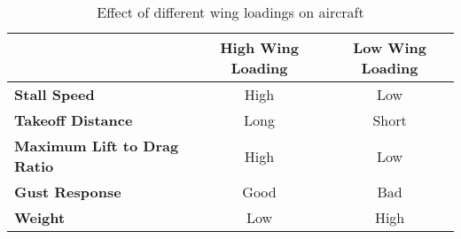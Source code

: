 \begin{table}[H]
\centering
    \begin{tabular}{@{}lcc@{}}
    \toprule
                                        & \textbf{High Wing Loading} & \textbf{Low Wing Loading} \\ \midrule
    \textbf{Stall Speed}                & High                       & Low                       \\
    \textbf{Takeoff Distance}           & Long                       & Short                     \\
    \textbf{Maximum Lift to Drag Ratio} & High                       & Low                       \\
    \textbf{Gust Response}              & Good                       & Bad                       \\
    \textbf{Weight}                     & Low                        & High                      \\ \bottomrule
    \end{tabular}
\caption{Effect of different wing loadings on aircraft}
\label{tab: wingloading_var}
\end{table}